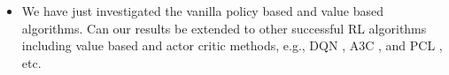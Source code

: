 \begin{itemize}
    \item We have just investigated the vanilla policy based and value based algorithms. Can our results be extended to other successful RL algorithms including value based and actor critic methods, e.g., DQN \cite{mnih2015human}, A3C \citep{mnih2016asynchronous}, and PCL \citep{nachum2017bridging}, etc.
\end{itemize}

\nocite{langley00}
\fi